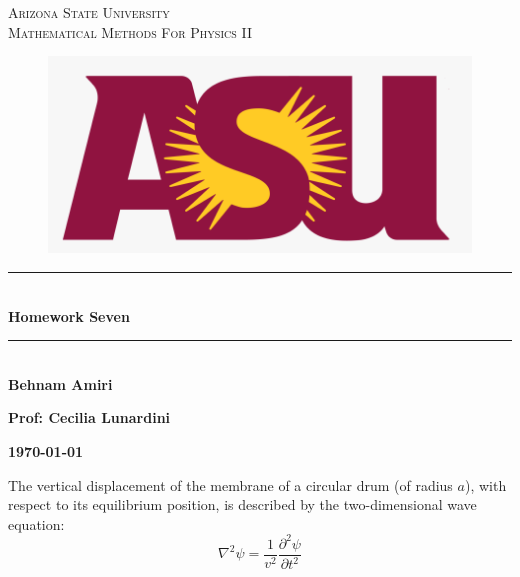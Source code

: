 \documentclass[fleqn]{article}
\begin{document}
  \begin{titlepage}

    \newcommand{\HRule}{\rule{\linewidth}{0.5mm}}

    \center


    \textsc{\LARGE Arizona State University}\\[1.5cm]

    \textsc{\LARGE Mathematical Methods For Physics II }\\[1.5cm]


    \begin{figure}
      \includegraphics[width=\linewidth]{asu.png}
    \end{figure}


    \HRule \\[0.4cm]
    { \huge \bfseries Homework Seven}\\[0.4cm] 
    \HRule \\[1.5cm]

    \textbf{Behnam Amiri}

    \bigbreak

    \textbf{Prof: Cecilia Lunardini}

    \bigbreak


    \textbf{{\large \today}\\[2cm]}

    \vfill

  \end{titlepage}

  The vertical displacement of the membrane of a circular drum (of radius $a$), with respect to its equilibrium position, is described by the two-dimensional wave equation: 
  $$
  \nabla^2 \psi = \frac{1}{v^2} \frac{\partial ^2 \psi}{\partial t^2}
  $$
\end{document}
